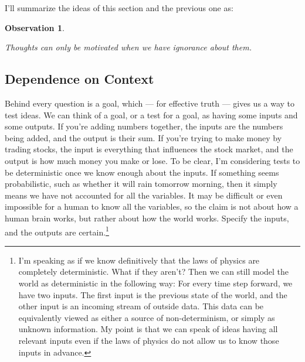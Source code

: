 \documentclass[11pt, oneside]{article}
\newtheorem{obs}{Observation}
\theoremstyle{argtstyle}
\begin{document}

I'll summarize the ideas of this section and the previous one as:
\newcommand{\obsfive}{
    Thoughts can only be motivated when we have ignorance about them.
}
\begin{obs}\label{o5}
    \obsfive
\end{obs}

\subsection{Dependence on Context}


Behind every question is a goal, which --- for effective truth --- gives
us a way to test ideas.
We can think of a goal, or a test for a goal, as having some inputs
and some outputs.
If you're adding numbers together,
the inputs are the numbers being added, and
the output is their sum.
If you're trying to make money by trading stocks,
the input is everything
that influences the stock market,
and the output is how much
money you make or lose.
To be clear, I'm considering tests to be deterministic once we know enough
about the inputs.
If something seems probabilistic,
such as whether it will
rain tomorrow morning, then it simply means we have not accounted for all
the variables.
It may be difficult or even impossible for a human to know all
the variables, so the claim is not about how a human brain works, but rather
about how the world works.
Specify the inputs, and the outputs are certain.\footnote{I'm speaking as if we
know definitively that the laws of physics are completely deterministic. What if
they aren't? Then we can still model the world as deterministic in the following
way: For every time step forward, we have two inputs. The first input is the
previous state of the world, and the other input is an incoming stream of
outside data. This data can be equivalently viewed as either a source of
non-determinism, or simply as unknown information. My point is that we can speak
of
ideas having all relevant inputs even if the laws of physics do not allow us to
know those inputs in advance.}
\end{document}
